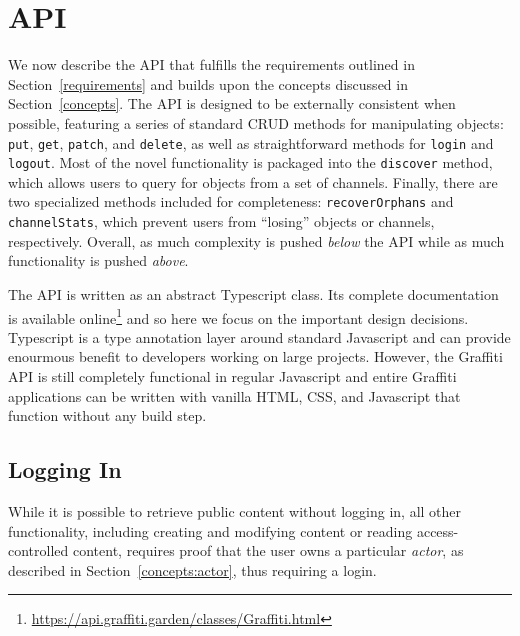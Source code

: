 \section{API}

We now describe the API that fulfills the requirements
outlined in Section~\ref{requirements} and builds upon the concepts
discussed in Section~\ref{concepts}.
The API is designed to be externally consistent when possible,
featuring a series of standard CRUD methods for manipulating objects:
\texttt{put}, \texttt{get}, \texttt{patch}, and \texttt{delete},
as well as straightforward methods for \texttt{login} and \texttt{logout}.
Most of the novel functionality is packaged into the \texttt{discover} method, which allows
users to query for objects from a set of channels.
Finally, there are two specialized methods included for completeness:
\texttt{recoverOrphans} and \texttt{channelStats},
which prevent users from ``losing'' objects or channels, respectively.
Overall, as much complexity is pushed \emph{below} the API
while as much functionality is pushed \emph{above}.

The API is written as an abstract Typescript class.
Its complete documentation is available online\footnote{
    \url{https://api.graffiti.garden/classes/Graffiti.html}
} and so here we focus on the important design decisions.
Typescript is a type annotation layer around standard Javascript
and can provide enourmous benefit to developers working on large projects.
However, the Graffiti API is still completely functional
in regular Javascript and entire Graffiti applications can be written
with vanilla HTML, CSS, and Javascript that function without
any build step.



\subsection{Logging In}

While it is possible to retrieve public content without logging in,
all other functionality, including
creating and modifying content or reading access-controlled content,
requires proof that the user owns a particular \emph{actor},
as described in Section~\ref{concepts:actor}, thus requiring a login.

